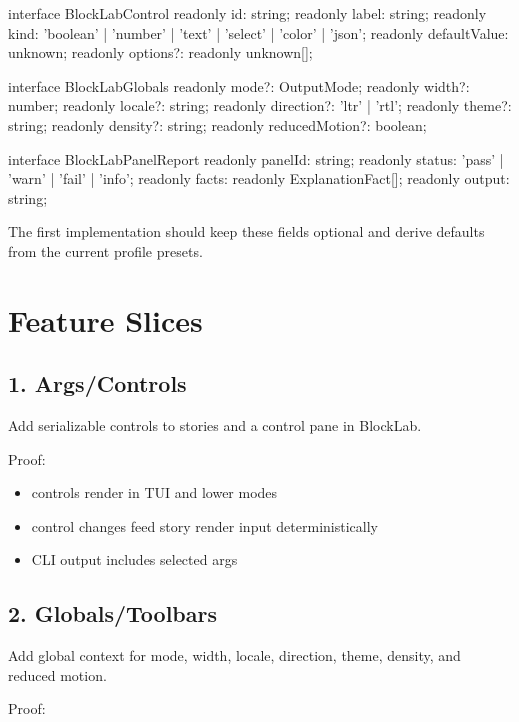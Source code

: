 \begin{CodeBlock}
interface BlockLabControl {
  readonly id: string;
  readonly label: string;
  readonly kind: 'boolean' | 'number' | 'text' | 'select' | 'color' | 'json';
  readonly defaultValue: unknown;
  readonly options?: readonly unknown[];
}

interface BlockLabGlobals {
  readonly mode?: OutputMode;
  readonly width?: number;
  readonly locale?: string;
  readonly direction?: 'ltr' | 'rtl';
  readonly theme?: string;
  readonly density?: string;
  readonly reducedMotion?: boolean;
}

interface BlockLabPanelReport {
  readonly panelId: string;
  readonly status: 'pass' | 'warn' | 'fail' | 'info';
  readonly facts: readonly ExplanationFact[];
  readonly output: string;
}
\end{CodeBlock}

The first implementation should keep these fields optional and derive defaults from the current profile presets.

\section{Feature Slices}\label{record-135-feature-slices}

\subsection{1. Args/Controls}\label{record-135-argscontrols}

Add serializable controls to stories and a control pane in BlockLab.

Proof:

\begin{itemize}
\tightlist
\item
  controls render in TUI and lower modes
\item
  control changes feed story render input deterministically
\item
  CLI output includes selected args
\end{itemize}

\subsection{2. Globals/Toolbars}\label{record-135-globalstoolbars}

Add global context for mode, width, locale, direction, theme, density, and reduced motion.

Proof:

